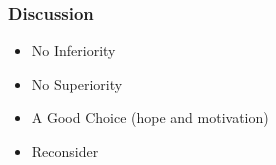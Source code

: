 \begin{frame}
    \frametitle{Discussion}
    \LARGE
    \begin{itemize}[<+->]
        \item No Inferiority
        \item No Superiority
        \item A Good Choice (hope and motivation)
        \item Reconsider
    \end{itemize}
\end{frame}
